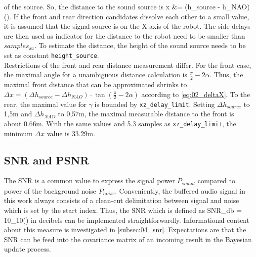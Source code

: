of the source.
So, the distance to the sound source is
\bal
\Delta x &= (\Delta h_{source} - \Delta h_{NAO}) \cdot \tan(\gamma).
\label{eq:02_deltaX}
\eal
If the front and rear direction candidates dissolve each other to a small
value, it is assumed that the signal source is on the X-axis of the robot.
The side delays are then used as indicator for the distance to the robot
need to be smaller than
 $samples_{xz}$.
To estimate the distance, the height of the sound source needs to be set as
constant  \lstinline!height_source!.\\
Restrictions of the front and rear distance measurement differ.
For the front case, the maximal angle for a unambiguous distance calculation
is $\frac{\pi}{2}- 2\alpha$.
Thus, the maximal front distance that can be approximated shrinks to
$\Delta x = (\Delta h_{source} - \Delta h_{NAO}) \cdot \tan(\frac{\pi}{2} - 2\alpha)$
according to \cref{eq:02_deltaX}.
To the rear, the maximal value for $\gamma$ is bounded by 
\lstinline!xz_delay_limit!.
Setting $\Delta h_{source}$ to 1,5\si{m} and $\Delta h_{NAO}$ to 0,57\si{m},
the maximal measurable distance to the front is about 0.66\si{m}.
With the same values and 5.3 samples as \lstinline!xz_delay_limit!, the
minimum $\Delta x$ value is 33.29\si{m}.

\subsection{SNR and PSNR}
\label{subsec:03_snr}

The \acf{SNR} is a common value to express the signal power $P_{signal}$ compared
to power of the background noise $P_{noise}$.
Conveniently, the buffered audio signal in this work always consists of
a clean-cut delimitation between signal and noise which is set by the
start index.
Thus, the \ac{SNR} which is defined as
\bal
    SNR_{db} = 10\log_{10}()
    \label{eq:03_snr}
\eal
in decibels can be implemented straightforwardly.
Informational content about this measure is investigated in \cref{subsec:04_snr}.
Expectations are that the \ac{SNR} can be feed into the covariance matrix
of an incoming result in the Bayesian update process.

